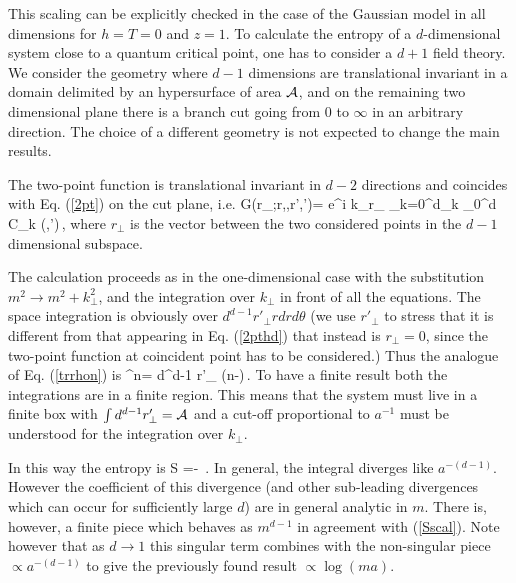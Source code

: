 \documentclass[12pt,aps]{revtex4}
\begin{document}
This scaling can be explicitly checked in the case of the Gaussian
model in all dimensions for $h=T=0$ and $z=1$.
To calculate the entropy of a $d$-dimensional system
close to a quantum critical point, one has to consider a $d+1$ field theory.
We consider the geometry where $d-1$ dimensions are translational invariant
in a domain delimited by an hypersurface of area $\cal A$,
and on the remaining two dimensional plane there is a branch cut going
from 0 to $\infty$ in an arbitrary direction.
The choice of a different geometry is not expected to change the main results.

The two-point function is translational invariant in $d-2$ directions and
coincides with Eq. (\ref{2pt}) on the cut plane, i.e.
\be
G(r_\perp;r,\theta,r',\theta')=
\int {} e^{i k_\perp r_\perp}
 \sum_{k=0}^\infty d_k \int_0^\infty \lambda d\lambda
{}
{\cal C}_k (\theta,\theta')\,,
\label{2pthd}
\ee
where $r_\perp$ is the vector between the two considered points in the
$d-1$ dimensional subspace.

The calculation proceeds as in the one-dimensional case with the substitution
$m^2\rightarrow m^2+k_\perp^2$, and the integration over $k_\perp$ in front
of all the equations. The space integration is obviously over
$d^{d-1}r'_\perp r dr d\theta$ (we use $r'_\perp$ to stress that it is
different from that appearing in Eq. (\ref{2pthd}) that instead is
$r_\perp=0$, since the two-point function at coincident point has to be
considered.)
Thus the analogue of Eq. (\ref{trrhon}) is
\be
{} \rho^n=
\int d^{d-1} r'_\perp \int {}
\left(n-\right)\,.
\ee
To have a finite result both the integrations are in a finite region.
This means that the system must live in a finite box with
$\int d^{d-1} r'_\perp={\cal A}$ and a cut-off proportional to $a^{-1}$
must be understood for the integration over $k_\perp$.


In this way the entropy is
\be
S%
=- \int {}
\log{}\,.
\label{Sd}
\ee
In general, the integral diverges like $a^{-(d-1)}$. However the
coefficient of this divergence (and other sub-leading divergences which
can occur for sufficiently large $d$) are in general analytic in $m$.
There is, however, a finite piece which behaves as $m^{d-1}$ in
agreement with (\ref{Sscal}). Note however that as $d\to1$ this singular
term combines with the non-singular piece $\propto a^{-(d-1)}$ to give
the previously found result $\propto\log(ma)$.
\end{document}

